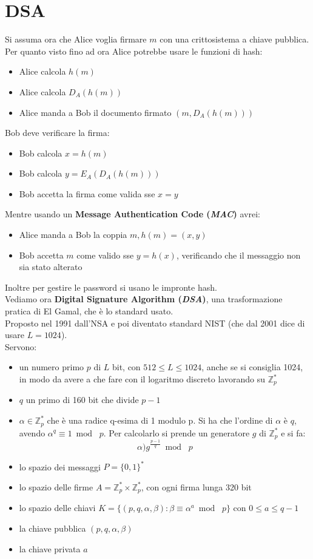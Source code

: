 \documentclass[a4paper,12pt, oneside]{book}
\begin{document}
\section{DSA}
Si assuma ora che Alice voglia firmare $m$ con una crittosistema a chiave
pubblica. Per quanto visto fino ad ora Alice potrebbe usare le funzioni di hash:
\begin{itemize}
  \item Alice calcola $h(m)$
  \item Alice calcola $D_A(h(m))$
  \item Alice manda a Bob il documento firmato $(m,D_A(h(m)))$
\end{itemize}
Bob deve verificare la firma:
\begin{itemize}
  \item Bob calcola $x=h(m)$
  \item Bob calcola $y=E_A(D_A(h(m)))$
  \item Bob accetta la firma come valida sse $x=y$
\end{itemize}
Mentre usando un \textbf{Message Authentication Code (\textit{MAC})} avrei:
\begin{itemize}
  \item Alice manda a Bob la coppia $m, h(m)=(x,y)$
  \item Bob accetta $m$ come valido sse $y=h(x)$, verificando che il messaggio
  non sia stato alterato
\end{itemize}
Inoltre per gestire le password si usano le impronte hash.\\
Vediamo ora \textbf{Digital Signature Algorithm (\textit{DSA})}, una
trasformazione pratica di El Gamal, che è lo standard usato.\\
Proposto nel 1991 dall'NSA e poi diventato standard NIST (che dal 2001 dice di
usare $L=1024$).\\
Servono:
\begin{itemize}
  \item un numero primo $p$ di $L$ bit, con $512\leq L\leq 1024$, anche se si
  consiglia 1024, in modo da avere a che fare con il logaritmo discreto
  lavorando su $\mathbb{Z}_p^*$
  \item $q$ un primo di 160 bit che divide $p-1$
  \item $\alpha\in\mathbb{Z}_p^*$ che è una radice q-esima di 1 modulo p. Si ha
  che l'ordine di $\alpha$ è $q$, avendo $\alpha^q\equiv 1\bmod\,\,p$. Per
  calcolarlo si prende un generatore $g$ di $\mathbb{Z}_p^*$ e si fa:
  \[\alpha)g^{\frac{p-1}{q}}\bmod\,\,p\]
  \item lo spazio dei messaggi $P=\{0,1\}^*$
  \item lo spazio delle firme $A=\mathbb{Z}_p^*\times \mathbb{Z}_p^*$, con ogni
  firma lunga 320 bit
  \item lo spazio delle chiavi
  $K=\{(p,q,\alpha,\beta):\beta\equiv\alpha^a\bmod\,\,p\}$ con $0\leq a \leq
  q-1$ 
  \item la chiave pubblica $(p,q,\alpha,\beta)$
  \item la chiave privata $a$
\end{itemize}
\end{document}
